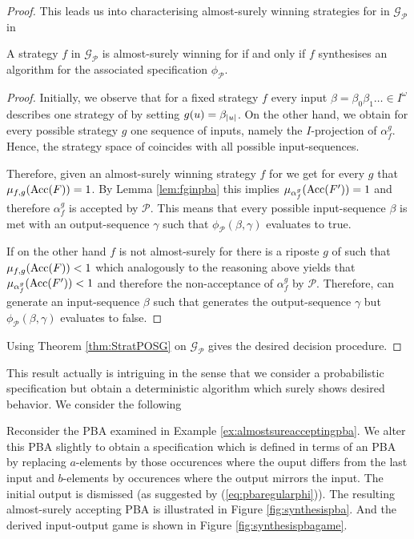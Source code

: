 \begin{proof}
  This leads us into characterising almost-surely winning strategies for \eve{} 
  in $\mathcal{G}_{\mathcal{P}}$ in
  \begin{lemma}
    A strategy $f$ in $\mathcal{G}_{\mathcal{P}}$ is almost-surely winning for
    \eve{} if and only if $f$ synthesises an algorithm for the associated 
    specification $\phi_{\mathcal{P}}$.
  \end{lemma}
  \begin{proof}
    Initially, we observe that for a fixed strategy $f$ every input
    $\beta = \beta_{0}\beta_{1}\dots\in I^{\omega}$ describes one strategy of 
    \adam{} by setting $g(u) = \beta_{\left\vert{u}\right\vert}$. On the other hand, we obtain
    for every possible strategy $g$ one sequence of inputs, namely the 
    $I$-projection of $\alpha_{f}^{g}$. Hence, the strategy space of \adam{}
    coincides with all possible input-sequences. 

    Therefore, given an almost-surely winning strategy $f$ for \eve{} we get 
    for every $g$ that $\mu_{f,g}(\operatorname{Acc}(F)) = 1$. By Lemma \ref{lem:fginpba} 
    this implies $\mu_{\alpha_{f}^{g}}(\operatorname{Acc}(F')) = 1$ and therefore 
    $\alpha_{f}^{g}$ is accepted by $\mathcal{P}$. This means that every 
    possible input-sequence $\beta$ is met with an output-sequence $\gamma$ 
    such that $\phi_{\mathcal{P}}(\beta, \gamma)$ evaluates to true.

    If on the other hand $f$ is not almost-surely for \eve{} there is a riposte 
    $g$ of \adam{} such that $\mu_{f,g}(\operatorname{Acc}(F)) < 1$ which analogously to the 
    reasoning above yields that $\mu_{\alpha_{f}^{g}}(\operatorname{Acc}(F')) < 1$ and 
    therefore the non-acceptance of $\alpha_{f}^{g}$ by $\mathcal{P}$. 
    Therefore, \adam{} can generate an input-sequence $\beta$ such that \eve{}
    generates the output-sequence $\gamma$ but 
    $\phi_{\mathcal{P}}(\beta, \gamma)$ evaluates to false.
  \end{proof}

  Using Theorem \ref{thm:StratPOSG} on $\mathcal{G}_{\mathcal{P}}$ gives the
  desired decision procedure.
\end{proof}
This result actually is intriguing in the sense that we consider a 
probabilistic specification but obtain a deterministic algorithm which surely 
shows desired behavior. We consider the following
\begin{example}
  Reconsider the \ac{PBA} examined in Example \ref{ex:almostsureacceptingpba}.
  We alter this \ac{PBA} slightly to obtain a specification which is defined in
  terms of an \ac{PBA} by replacing $a$-elements by those occurences where the
  ouput differs from the last input and $b$-elements by occurences where the 
  output mirrors the input. The initial output is dismissed (as suggested by
  (\ref{eq:pbaregularphi})). The resulting almost-surely accepting \ac{PBA} is
  illustrated in Figure \ref{fig:synthesispba}. And the derived input-output 
  game is shown in Figure \ref{fig:synthesispbagame}.
  \label{ex:pbasynthesis}
\end{example}

